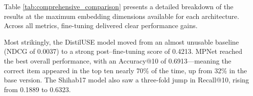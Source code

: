 \documentclass[acmsmall,screen,review]{acmart}
\begin{document}
\begin{table}[!htbp]
    \centering
    \caption{Comparative Performance of Fine-Tuned (FT) Models vs. Baselines at Maximum Dimensions. The best scores are highlighted in \textbf{bold}. The $\dagger$ symbol indicates that the best model (MPNet) is statistically significantly better than the second-best model (Shihab17) with $p < 0.001$.}
    \label{tab:comprehensive_comparison}
\end{table}


Table \ref{tab:comprehensive_comparison} presents a detailed breakdown of the results at the maximum embedding dimensions available for each architecture. Across all metrics, fine-tuning delivered clear performance gains.

Most strikingly, the DistilUSE model moved from an almost unusable baseline (NDCG of 0.0037) to a strong post–fine-tuning score of 0.4213. MPNet reached the best overall performance, with an Accuracy@10 of 0.6913—meaning the correct item appeared in the top ten nearly 70\% of the time, up from 32\% in the base version. The Shihab17 model also saw a three-fold jump in Recall@10, rising from 0.1889 to 0.6323.
\end{document}

